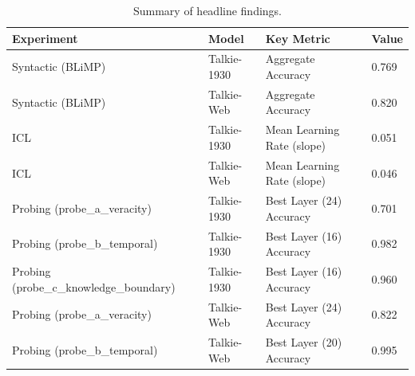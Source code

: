 \begin{table}
\caption{Summary of headline findings.}
\label{tab:summary}
\begin{tabular}{llll}
\toprule
Experiment & Model & Key Metric & Value \\
\midrule
Syntactic (BLiMP) & Talkie-1930 & Aggregate Accuracy & 0.769 \\
Syntactic (BLiMP) & Talkie-Web & Aggregate Accuracy & 0.820 \\
ICL & Talkie-1930 & Mean Learning Rate (slope) & 0.051 \\
ICL & Talkie-Web & Mean Learning Rate (slope) & 0.046 \\
Probing (probe\_a\_veracity) & Talkie-1930 & Best Layer (24) Accuracy & 0.701 \\
Probing (probe\_b\_temporal) & Talkie-1930 & Best Layer (16) Accuracy & 0.982 \\
Probing (probe\_c\_knowledge\_boundary) & Talkie-1930 & Best Layer (16) Accuracy & 0.960 \\
Probing (probe\_a\_veracity) & Talkie-Web & Best Layer (24) Accuracy & 0.822 \\
Probing (probe\_b\_temporal) & Talkie-Web & Best Layer (20) Accuracy & 0.995 \\
\bottomrule
\end{tabular}
\end{table}
